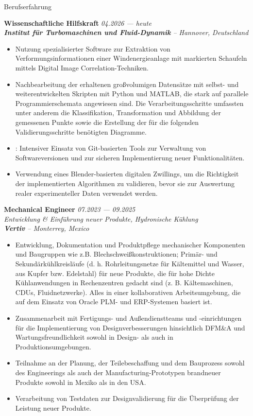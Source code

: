 \documentclass[a4paper]{resume} %
\begin{document}
	\begin{rSection}{Berufserfahrung}
	
		{\bf Wissenschaftliche Hilfskraft} \hfill{\itshape 04.2026 --- heute} 
		\\{\textit{\textbf{Institut für Turbomaschinen und Fluid-Dynamik} -- Hannover, Deutschland}}
		\begin{itemize}
			\item Nutzung spezialisierter Software zur Extraktion von Verformungsinformationen einer Windenergieanlage mit markierten Schaufeln mittels Digital Image Correlation-Techniken. 
			\item Nachbearbeitung der erhaltenen großvolumigen Datensätze mit selbst- und weiterentwickelten Skripten mit Python und MATLAB, die stark auf parallele Programmierschemata angewiesen sind. Die Verarbeitungsschritte umfassten unter anderem die Klassifikation, Transformation und Abbildung der gemessenen Punkte sowie die Erstellung der für die folgenden Validierungsschritte benötigten Diagramme. 
			\item: Intensiver Einsatz von Git-basierten Tools zur Verwaltung von Softwareversionen und zur sicheren Implementierung neuer Funktionalitäten.
			\item Verwendung eines Blender-basierten digitalen Zwillings, um die Richtigkeit der implementierten Algorithmen zu validieren, bevor sie zur Auswertung realer experimenteller Daten verwendet werden.
		\end{itemize}
	
	
        {\bf Mechanical Engineer} \hfill{\itshape 07.2023 --- 09.2025} 
        \\{\textit{Entwicklung \& Einführung neuer Produkte, Hydronische Kühlung}}
        \\{\textit{\textbf{Vertiv} -- Monterrey, Mexico}}
        \begin{itemize}
            \item Entwicklung, Dokumentation und Produktpflege mechanischer Komponenten und Baugruppen wie z.B. Blechschweißkonstruktionen; Primär- und Sekundärkühlkreisläufe (d. h. Rohrleitungsnetze für Kältemittel und Wasser, aus Kupfer bzw. Edelstahl) für neue Produkte, die für hohe Dichte Kühlanwendungen in Rechenzentren gedacht sind (z. B. Kältemaschinen, CDUs, Fluidnetzwerke). Alles in einer kollaborativen Arbeitsumgebung, die auf dem Einsatz von Oracle PLM- und ERP-Systemen basiert ist.
            \item Zusammenarbeit mit Fertigungs- und Außendienstteams und -einrichtungen für die Implementierung von Designverbesserungen hinsichtlich DFM\&A und Wartungsfreundlichkeit sowohl in Design- als auch in Produktionsumgebungen.
            \item Teilnahme an der Planung, der Teilebeschaffung und dem Bauprozess sowohl des Engineerings als auch der Manufacturing-Prototypen brandneuer Produkte sowohl in Mexiko als in den USA.
            \item Verarbeitung von Testdaten zur Designvalidierung für die Überprüfung der Leistung neuer Produkte.
        \end{itemize}
        

\end{rSection}
\end{document}
